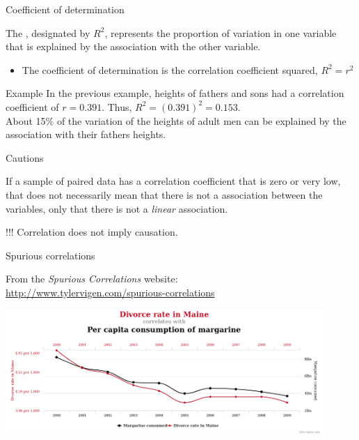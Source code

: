 \documentclass[xcolor=table]{beamer}
\begin{document}
\begin{frame}{Coefficient of determination}
\begin{block}{}
\large
The , designated by $R^2$, represents the proportion of variation in one variable that is explained by the association with the other variable.
\begin{itemize}
\item The coefficient of determination is the correlation coefficient squared,  $R^2 = r^2$
\end{itemize}
\end{block}

\pause
\begin{exampleblock}{Example}
\large
In the previous example, heights of fathers and sons had a correlation coefficient of $r=0.391$. Thus, $R^2 = (0.391)^2 = 0.153$.\\
\medskip
About 15\% of the variation of the heights of adult men can be explained by the association with their fathers heights.
\end{exampleblock}
\end{frame}

\begin{frame}{Cautions}
\begin{block}{}
\large
If a sample of paired data has a correlation coefficient that is zero or very low, that does not necessarily mean that there is not a association between the variables, only that there is not a \emph{linear} association. 
\end{block}

\pause
\begin{alertblock}{!!!}
\Large
Correlation does not imply causation.
\end{alertblock}
\end{frame}

\begin{frame}{Spurious correlations}
\begin{block}{}
From the \emph{Spurious Correlations} website:\\ \url{http://www.tylervigen.com/spurious-correlations}
\end{block}
\bigskip
{\centering
\includegraphics[width=4.75in]{../images/ch10_cor_spur}
\par}

\end{frame}
\end{document}
